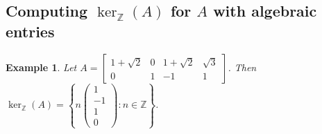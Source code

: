\documentclass{article}
\newcommand{\Z}[0]{\mathbb{Z}}		%
\newcommand{\R}[0]{\mathbb{R}}		%
\newtheorem{ex}[thm]{Example}
\theoremstyle{definition}
\theoremstyle{remark}
\begin{document}
\subsection{Computing $\ker_\Z(A)$ for $A$ with algebraic entries}
\begin{ex}\label{DimDiff}
Let $A = \begin{bmatrix}1+\sqrt{2} & 0 & 1+\sqrt{2} & \sqrt{3} \\ 0 & 1 & -1 &1\end{bmatrix}$. Then $\ker_\Z(A) = \left\{n\begin{pmatrix} 1\\ -1\\ 1\\ 0\end{pmatrix}: n\in \Z\right\}$. 
\end{ex}
\end{document}
